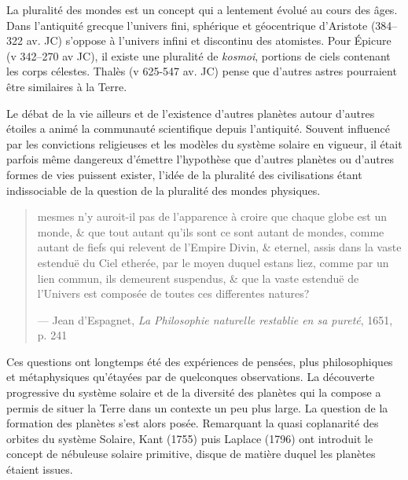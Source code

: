La pluralité des mondes est un concept qui a lentement évolué au cours des âges. Dans l'antiquité grecque l'univers fini, sphérique et géocentrique d'Aristote (384--322 av. JC) s'oppose à l'univers infini et discontinu des atomistes. Pour Épicure (v 342--270 av JC), il existe une pluralité de \textit{kosmoi}, portions de ciels contenant les corps célestes. Thalès (v 625-547 av. JC) pense que d'autres astres pourraient être similaires à la Terre. 

Le débat de la vie ailleurs et de l'existence d'autres planètes autour d'autres étoiles a animé la communauté scientifique
depuis l'antiquité. Souvent influencé par les convictions religieuses et les modèles du système solaire en vigueur, il était
parfois même dangereux d'émettre l'hypothèse que d'autres planètes ou d'autres formes de vies puissent exister, l'idée de la
pluralité des civilisations étant indissociable de la question de la pluralité des mondes physiques. 

\begin{quote}
\og mesmes n'y auroit-il pas de l'apparence à croire que chaque globe est un monde, \& que tout autant qu'ils sont ce sont autant de mondes, comme autant de fiefs qui relevent de l'Empire Divin, \& eternel, assis dans la vaste estenduë du Ciel etherée, par le moyen duquel estans liez, comme par un lien commun, ils demeurent suspendus, \& que la vaste estenduë de l'Univers est composée de toutes ces differentes natures?\fg 

--- Jean d'Espagnet, \textit{La Philosophie naturelle restablie en sa pureté}, 1651, p. 241 \cite{espagnet1651philosophie}
\end{quote}

Ces questions ont longtemps été des expériences de pensées, plus philosophiques et métaphysiques qu'étayées par de quelconques observations. La découverte progressive du système solaire et de la diversité des planètes qui la compose a permis de situer la Terre dans un contexte un peu plus large. La question de la formation des planètes s'est alors posée. Remarquant la quasi coplanarité des orbites du système Solaire, Kant (1755) puis Laplace (1796) ont introduit le concept de nébuleuse solaire primitive, disque de matière duquel les planètes étaient issues. 

